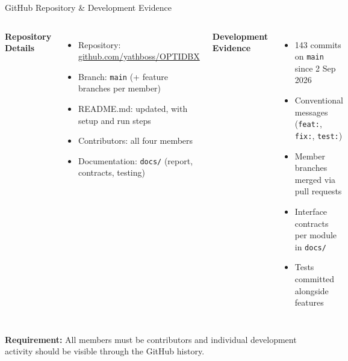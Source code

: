 \documentclass[aspectratio=169,11pt]{beamer}
\begin{document}
\begin{frame}{GitHub Repository \& Development Evidence}

\begin{columns}[T,totalwidth=\textwidth]


\textbf{\color{GEUBlue}Repository Details}

\begin{itemize}\itemsep2pt\small
    \item Repository: \href{https://github.com/yathboss/OPTIDBX}{github.com/yathboss/OPTIDBX}
    \item Branch: \texttt{main} (+ feature branches per member)
    \item README.md: updated, with setup and run steps
    \item Contributors: all four members
    \item Documentation: \texttt{docs/} (report, contracts, testing)
\end{itemize}


\textbf{\color{GEUBlue}Development Evidence}

\begin{itemize}\itemsep2pt\small
    \item 143 commits on \texttt{main} since 2 Sep 2026
    \item Conventional messages (\texttt{feat:}, \texttt{fix:}, \texttt{test:})
    \item Member branches merged via pull requests
    \item Interface contracts per module in \texttt{docs/}
    \item Tests committed alongside features
\end{itemize}

\end{columns}

\vfill

\begin{center}
\colorbox{GEULightBlue}{
\parbox{.88\textwidth}{
\centering
\textbf{Requirement:}
All members must be contributors and individual development
activity should be visible through the GitHub history.
}}
\end{center}

\end{frame}
\end{document}
